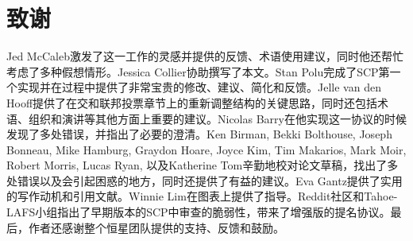 \section{致谢}

Jed McCaleb激发了这一工作的灵感并提供的反馈、术语使用建议，同时他还帮忙考虑了多种假想情形。Jessica Collier协助撰写了本文。Stan Polu完成了SCP第一个实现并在过程中提供了非常宝贵的修改、建议、简化和反馈。Jelle van den Hooff提供了在{\quorum}交和联邦投票章节上的重新调整结构的关键思路，同时还包括术语、组织和演讲等其他方面上重要的建议。Nicolas Barry在他实现这一协议的时候发现了多处错误，并指出了必要的澄清。Ken Birman, Bekki Bolthouse, Joseph Bonneau, Mike Hamburg, Graydon Hoare, Joyce Kim, Tim Makarios, Mark Moir, Robert Morris, Lucas Ryan, 以及Katherine Tom辛勤地校对论文草稿，找出了多处错误以及会引起困惑的地方，同时还提供了有益的建议。Eva Gantz提供了实用的写作动机和引用文献。Winnie Lim在图表上提供了指导。Reddit社区和Tahoe-LAFS小组指出了早期版本的SCP中审查的脆弱性，带来了增强版的提名协议。最后，作者还感谢整个恒星团队提供的支持、反馈和鼓励。